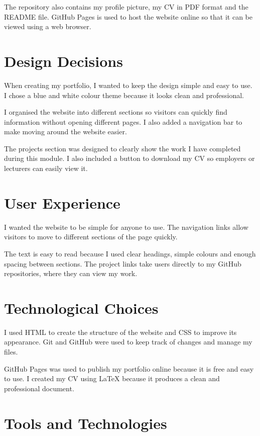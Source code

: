 \documentclass[a4paper,12pt]{article}
\begin{document}
The repository also contains my profile picture, my CV in PDF format and
the README file. GitHub Pages is used to host the website online so that
it can be viewed using a web browser.

\section{Design Decisions}

When creating my portfolio, I wanted to keep the design simple and easy to
use. I chose a blue and white colour theme because it looks clean and
professional.

I organised the website into different sections so visitors can quickly
find information without opening different pages. I also added a
navigation bar to make moving around the website easier.

The projects section was designed to clearly show the work I have
completed during this module. I also included a button to download my CV
so employers or lecturers can easily view it.

\section{User Experience}

I wanted the website to be simple for anyone to use. The navigation links
allow visitors to move to different sections of the page quickly.

The text is easy to read because I used clear headings, simple colours and
enough spacing between sections. The project links take users directly to
my GitHub repositories, where they can view my work.

\section{Technological Choices}

I used HTML to create the structure of the website and CSS to improve its
appearance. Git and GitHub were used to keep track of changes and manage
my files.

GitHub Pages was used to publish my portfolio online because it is free
and easy to use. I created my CV using LaTeX because it produces a clean
and professional document.

\section{Tools and Technologies}
\end{document}
